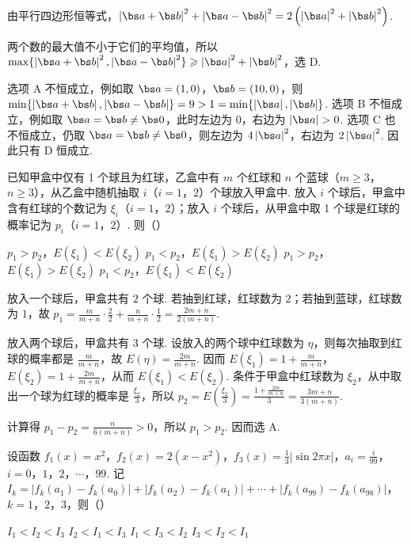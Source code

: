 \begin{solution}
由平行四边形恒等式，\(\left|\bs a+\bs b\right|^2+\left|\bs a-\bs b\right|^2=2\left(\left|\bs a\right|^2+\left|\bs b\right|^2\right)\).

两个数的最大值不小于它们的平均值，所以 \(\max\{\left|\bs a+\bs b\right|^2,\left|\bs a-\bs b\right|^2\}\geqslant\left|\bs a\right|^2+\left|\bs b\right|^2\)，选 D.

选项 A 不恒成立，例如取 \(\bs a=(1,0)\)，\(\bs b=(10,0)\)，则
\(\min\{\left|\bs a+\bs b\right|,\left|\bs a-\bs b\right|\}=9>1=\min\{\left|\bs a\right|,\left|\bs b\right|\}\). 选项 B 不恒成立，例如取 \(\bs a=\bs b\neq\bs0\)，此时左边为 \(0\)，右边为 \(\left|\bs a\right|>0\). 选项 C 也不恒成立，仍取 \(\bs a=\bs b\neq\bs0\)，则左边为 \(4\left|\bs a\right|^2\)，右边为 \(2\left|\bs a\right|^2\). 因此只有 D 恒成立.
\end{solution}

\begin{problem}
已知甲盒中仅有 1 个球且为红球，乙盒中有 \(m\) 个红球和 \(n\) 个蓝球（\(m \geqslant 3\)，\(n \geqslant 3\)），从乙盒中随机抽取 \(i\)（\(i = 1\)，\(2\)）个球放入甲盒中.
放入 \(i\) 个球后，甲盒中含有红球的个数记为 \(\xi_i\)（\(i = 1\)，\(2\)）；放入 \(i\) 个球后，从甲盒中取 1 个球是红球的概率记为 \(p_i\)（\(i = 1\)，\(2\)）.
则（\quad）

\choices
    {\(p_1 > p_2\)，\(E(\xi_1) < E(\xi_2)\)}
    {\(p_1 < p_2\)，\(E(\xi_1) > E(\xi_2)\)}
    {\(p_1 > p_2\)，\(E(\xi_1) > E(\xi_2)\)}
    {\(p_1 < p_2\)，\(E(\xi_1) < E(\xi_2)\)}
\end{problem}

\begin{solution}
放入一个球后，甲盒共有 \(2\) 个球. 若抽到红球，红球数为 \(2\)；若抽到蓝球，红球数为 \(1\)，故 \(p_1=\frac{m}{m+n}\cdot\frac22+\frac{n}{m+n}\cdot\frac12=\frac{2m+n}{2(m+n)}\).

放入两个球后，甲盒共有 \(3\) 个球. 设放入的两个球中红球数为 \(\eta\)，则每次抽取到红球的概率都是 \(\frac{m}{m+n}\)，故 \(E(\eta)=\frac{2m}{m+n}\). 因而 \(E(\xi_1)=1+\frac{m}{m+n}\)，\(E(\xi_2)=1+\frac{2m}{m+n}\)，从而 \(E(\xi_1)<E(\xi_2)\). 条件于甲盒中红球数为 \(\xi_2\)，从中取出一个球为红球的概率是 \(\frac{\xi_2}{3}\)，所以
\(p_2=E\left(\frac{\xi_2}{3}\right)=\frac{1+\frac{2m}{m+n}}{3}=\frac{3m+n}{3(m+n)}\).

计算得 \(p_1-p_2=\frac{n}{6(m+n)}>0\)，所以 \(p_1>p_2\). 因而选 A.
\end{solution}

\begin{problem}
设函数 \( f_{1}(x) = x^{2} \)，\( f_{2}(x) = 2(x - x^{2}) \)，\( f_{3}(x) = \frac{1}{3} |\sin 2\pi x| \)，\( a_{i} = \frac{i}{99} \)，\(i = 0\)，\(1\)，\(2\)，\(\cdots\)，\(99\). 记 \( I_{k} = |f_{k}(a_{1}) - f_{k}(a_{0})| + |f_{k}(a_{2}) - f_{k}(a_{1})| + \cdots + |f_{k}(a_{99}) - f_{k}(a_{98})| \)，\(k = 1\)，\(2\)，\(3\)，则（\quad）

\choices
    {\(I_{1} < I_{2} < I_{3}\)}
    {\(I_{2} < I_{1} < I_{3}\)}
    {\(I_{1} < I_{3} < I_{2}\)}
    {\(I_{3} < I_{2} < I_{1}\)}
\end{problem}

